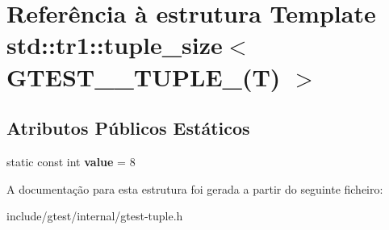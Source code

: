 \hypertarget{structstd_1_1tr1_1_1tuple__size_3_01GTEST__8__TUPLE___07T_08_01_4}{\section{Referência à estrutura Template std\-:\-:tr1\-:\-:tuple\-\_\-size$<$ G\-T\-E\-S\-T\-\_\-\_\-\-T\-U\-P\-L\-E\-\_\-(T) $>$}
\label{structstd_1_1tr1_1_1tuple__size_3_01GTEST__8__TUPLE___07T_08_01_4}
}
\subsection*{Atributos Públicos Estáticos}
\begin{DoxyCompactItemize}
\item 
\hypertarget{structstd_1_1tr1_1_1tuple__size_3_01GTEST__8__TUPLE___07T_08_01_4_a71abbf8156b1b110d3b8894ce02a44d8}{static const int {\bfseries value} = 8}\label{structstd_1_1tr1_1_1tuple__size_3_01GTEST__8__TUPLE___07T_08_01_4_a71abbf8156b1b110d3b8894ce02a44d8}

\end{DoxyCompactItemize}


A documentação para esta estrutura foi gerada a partir do seguinte ficheiro\-:\begin{DoxyCompactItemize}
\item 
include/gtest/internal/gtest-\/tuple.\-h\end{DoxyCompactItemize}
